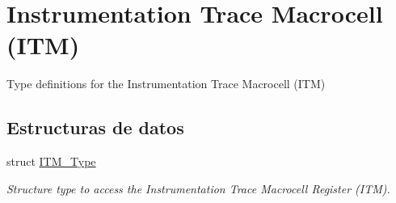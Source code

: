 \hypertarget{group___c_m_s_i_s___i_t_m}{}\section{Instrumentation Trace Macrocell (I\+TM)}
\label{group___c_m_s_i_s___i_t_m}


Type definitions for the Instrumentation Trace Macrocell (I\+TM)  


\subsection*{Estructuras de datos}
\begin{DoxyCompactItemize}
\item 
struct \mbox{\hyperlink{struct_i_t_m___type}{I\+T\+M\+\_\+\+Type}}
\begin{DoxyCompactList}\small\item\em Structure type to access the Instrumentation Trace Macrocell Register (I\+TM). \end{DoxyCompactList}\end{DoxyCompactItemize}
